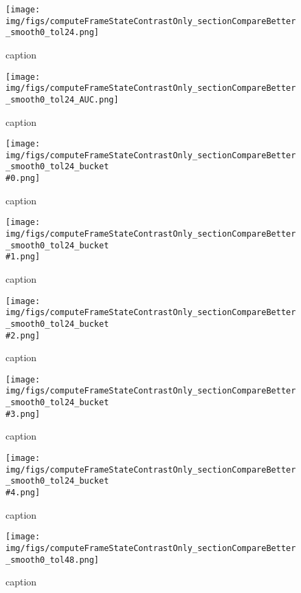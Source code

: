 %
\begin{figure}[!ht]
	\centering
	\texttt{[image: img/figs/computeFrameStateContrastOnly\_sectionCompareBetter\_smooth0\_tol24.png]}
	\caption{caption}
	\label{fig:computeFrameStateContrastOnly_sectionCompareBetter_smooth0_tol24.png}
\end{figure}
%
\begin{figure}[!ht]
	\centering
	\texttt{[image: img/figs/computeFrameStateContrastOnly\_sectionCompareBetter\_smooth0\_tol24\_AUC.png]}
	\caption{caption}
	\label{fig:computeFrameStateContrastOnly_sectionCompareBetter_smooth0_tol24_AUC.png}
\end{figure}
%
\begin{figure}[!ht]
	\centering
	\texttt{[image: img/figs/computeFrameStateContrastOnly\_sectionCompareBetter\_smooth0\_tol24\_bucket\\\#0.png]}
	\caption{caption}
	\label{fig:computeFrameStateContrastOnly_sectionCompareBetter_smooth0_tol24_bucket\#0.png}
\end{figure}
%
\begin{figure}[!ht]
	\centering
	\texttt{[image: img/figs/computeFrameStateContrastOnly\_sectionCompareBetter\_smooth0\_tol24\_bucket\\\#1.png]}
	\caption{caption}
	\label{fig:computeFrameStateContrastOnly_sectionCompareBetter_smooth0_tol24_bucket\#1.png}
\end{figure}
%
\begin{figure}[!ht]
	\centering
	\texttt{[image: img/figs/computeFrameStateContrastOnly\_sectionCompareBetter\_smooth0\_tol24\_bucket\\\#2.png]}
	\caption{caption}
	\label{fig:computeFrameStateContrastOnly_sectionCompareBetter_smooth0_tol24_bucket\#2.png}
\end{figure}
%
\begin{figure}[!ht]
	\centering
	\texttt{[image: img/figs/computeFrameStateContrastOnly\_sectionCompareBetter\_smooth0\_tol24\_bucket\\\#3.png]}
	\caption{caption}
	\label{fig:computeFrameStateContrastOnly_sectionCompareBetter_smooth0_tol24_bucket\#3.png}
\end{figure}
%
\begin{figure}[!ht]
	\centering
	\texttt{[image: img/figs/computeFrameStateContrastOnly\_sectionCompareBetter\_smooth0\_tol24\_bucket\\\#4.png]}
	\caption{caption}
	\label{fig:computeFrameStateContrastOnly_sectionCompareBetter_smooth0_tol24_bucket\#4.png}
\end{figure}
%
\begin{figure}[!ht]
	\centering
	\texttt{[image: img/figs/computeFrameStateContrastOnly\_sectionCompareBetter\_smooth0\_tol48.png]}
	\caption{caption}
	\label{fig:computeFrameStateContrastOnly_sectionCompareBetter_smooth0_tol48.png}
\end{figure}
